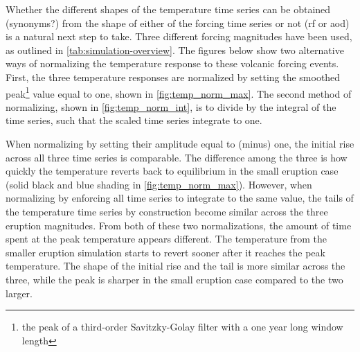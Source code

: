 \documentclass{ametsocV5}
\begin{document}
Whether the different shapes of the temperature time series can be obtained (synonyms?)
from the shape of either of the forcing time series or not (\ac{rf} or \ac{aod}) is a
natural next step to take. Three different forcing magnitudes have been used, as
outlined in \cref{tab:simulation-overview}. The figures below show two alternative ways
of normalizing the temperature response to these volcanic forcing events. First, the
three temperature responses are normalized by setting the smoothed peak\footnote{the
  peak of a third-order Savitzky-Golay filter with a one year long window length} value
equal to one, shown in \cref{fig:temp_norm_max}. The second method of normalizing, shown
in \cref{fig:temp_norm_int}, is to divide by the integral of the time series, such that
the scaled time series integrate to one.

When normalizing by setting their amplitude equal to (minus) one, the initial rise
across all three time series is comparable. The difference among the three is how
quickly the temperature reverts back to equilibrium in the small eruption case (solid
black and blue shading in \cref{fig:temp_norm_max}). However, when normalizing by
enforcing all time series to integrate to the same value, the tails of the temperature
time series by construction become similar across the three eruption magnitudes. From
both of these two normalizations, the amount of time spent at the peak temperature
appears different. The temperature from the smaller eruption simulation starts to revert
sooner after it reaches the peak temperature. The shape of the initial rise and the tail
is more similar across the three, while the peak is sharper in the small eruption case
compared to the two larger.

\end{document}
